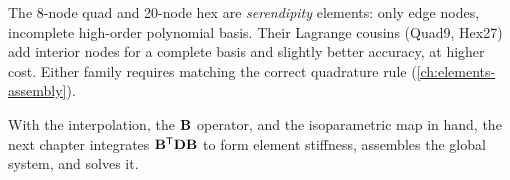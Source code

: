 \begin{remark}
The 8-node quad and 20-node hex are \emph{serendipity} elements: only
edge nodes, incomplete high-order polynomial basis. Their Lagrange
cousins (Quad9, Hex27) add interior nodes for a complete basis and
slightly better accuracy, at higher cost. Either family requires
matching the correct quadrature rule (\cref{ch:elements-assembly}).
\end{remark}

With the interpolation, the $\mathbf{B}$ operator, and the isoparametric map
in hand, the next chapter integrates $\mathbf{B}^{\mathsf{T}}\mathbf{D}\mathbf{B}$ to form
element stiffness, assembles the global system, and solves it.
